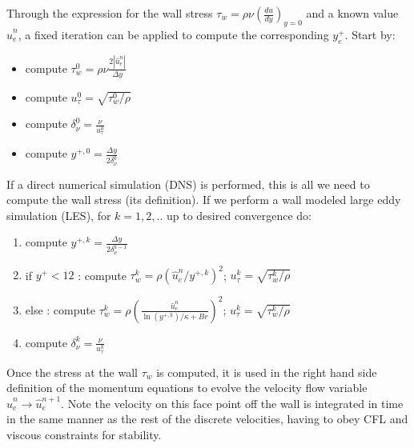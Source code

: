 \documentclass[12pt]{article}
\begin{document}
Through the expression for the wall stress $\tau_w = \rho \nu \left( \frac{d u}{d y} \right)_{y=0}$ and a known value $\hat{u}_e^n$, a fixed iteration can be applied to compute the corresponding $y^{+}_e$. Start by:
%
\begin{itemize}
   \item compute $\tau_w^0 = \rho \nu \frac{2 |\hat{u}_e^n|}{\Delta y}$
   \item compute $u_\tau^0 = \sqrt{\tau_w^0 / \rho}$
   \item compute $\delta_\nu^0 = \frac{\nu}{u_\tau^0}$
   \item compute $y^{+,0} = \frac{\Delta y}{2 \delta_\nu^0}$
\end{itemize}
%
If a direct numerical simulation (DNS) is performed, this is all we need to compute the wall stress (its definition). If we perform a wall modeled large eddy simulation (LES), for $k=1,2,..$ up to desired convergence do:
%
\begin{enumerate}
   \item compute $y^{+,k} = \frac{\Delta y}{2 \delta_\nu^{k-1}}$
   \item if $y^+ < 12$ : compute $\tau_w^k = \rho (\hat{u}_e^n / y^{+,k})^2$; $u_\tau^k = \sqrt{\tau_w^k/\rho}$ %
   \item else : compute   $\tau_w^k = \rho \left( \frac{\hat{u}_e^n}{\ln (y^{+,k})/\kappa+Br} \right)^2$; $u_\tau^k = \sqrt{\tau_w^k/\rho}$ %
   \item compute $\delta_\nu^{k} = \frac{\nu}{u_\tau^k}$
\end{enumerate}
%
%
Once the stress at the wall $\tau_w$ is computed, it is used in the right hand side definition of the momentum equations to evolve the velocity flow variable $\hat{u}_e^n \rightarrow \hat{u}_e^{n+1}$. Note the velocity on this face point off the wall is integrated in time in the same manner as the rest of the discrete velocities, having to obey CFL and viscous constraints for stability.
\end{document}
